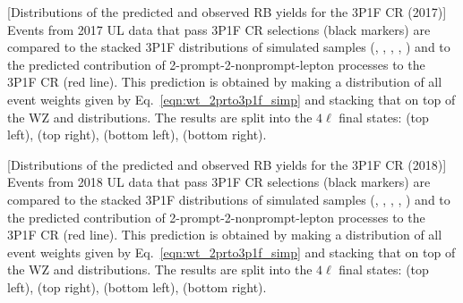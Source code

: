 \begin{multiFigure}
	\centering
		[Distributions of the predicted and observed RB yields for the 3P1F CR (2017)]
		{Events from 2017 UL data that pass 3P1F CR selections (black markers) 
		are compared to the stacked 3P1F distributions of simulated samples
		(\Zplusjets, \ttbarplusjets, \WZ, \ZZ, \Zgammastar)
		and to the predicted contribution of 2-prompt-2-nonprompt-lepton processes to the 3P1F CR (red line).
		This prediction is obtained by making a distribution of all event weights given by Eq.~\ref{eqn:wt_2prto3p1f_simp} and stacking that on top of the WZ and \ZZ distributions.
		The results are split into the $4\ell$ final states:
		\fourmu (top left), \foure (top right), \twoetwomu (bottom left), \twomutwoe (bottom right).}
	\label{cr_plots_3p1f_2017}
\end{multiFigure}
\begin{multiFigure}
		[Distributions of the predicted and observed RB yields for the 3P1F CR (2018)]
		{Events from 2018 UL data that pass 3P1F CR selections (black markers) 
		are compared to the stacked 3P1F distributions of simulated samples
		(\Zplusjets, \ttbarplusjets, \WZ, \ZZ, \Zgammastar)
		and to the predicted contribution of 2-prompt-2-nonprompt-lepton processes to the 3P1F CR (red line).
		This prediction is obtained by making a distribution of all event weights given by Eq.~\ref{eqn:wt_2prto3p1f_simp} and stacking that on top of the WZ and \ZZ distributions.
		The results are split into the $4\ell$ final states:
		\fourmu (top left), \foure (top right), \twoetwomu (bottom left), \twomutwoe (bottom right).}
	\label{cr_plots_3p1f_2018}
\end{multiFigure}

